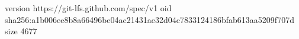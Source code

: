 version https://git-lfs.github.com/spec/v1
oid sha256:a1b006ee8b8a66496be04ac21431ae32d04c7833124186bfab613aa5209f707d
size 4677
